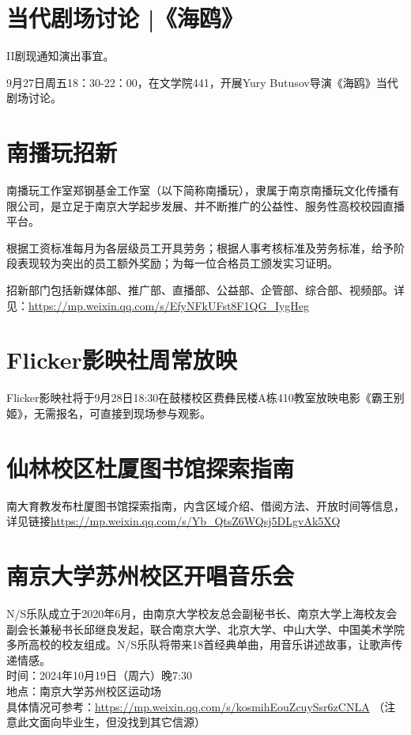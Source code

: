 \documentclass[letterpaper, 12pt]{article}
\begin{document}
\begin{multicols}{2}
\section{当代剧场讨论 |《海鸥》}
II剧现通知演出事宜。

9月27日周五18：30-22：00，在文学院441，开展Yury Butusov导演《海鸥》当代剧场讨论。
\section{南播玩招新}
南播玩工作室郑钢基金工作室（以下简称南播玩），隶属于南京南播玩文化传播有限公司，是立足于南京大学起步发展、并不断推广的公益性、服务性高校校园直播平台。

根据工资标准每月为各层级员工开具劳务；根据人事考核标准及劳务标准，给予阶段表现较为突出的员工额外奖励；为每一位合格员工颁发实习证明。

招新部门包括新媒体部、推广部、直播部、公益部、企管部、综合部、视频部。详见：\url{https://mp.weixin.qq.com/s/EfyNFkUFst8F1QG_IygHeg}
\section{Flicker影映社周常放映}
Flicker影映社将于9月28日18:30在鼓楼校区费彝民楼A栋410教室放映电影《霸王别姬》，无需报名，可直接到现场参与观影。
\section{仙林校区杜厦图书馆探索指南}
南大育教发布杜厦图书馆探索指南，内含区域介绍、借阅方法、开放时间等信息，详见链接\url{https://mp.weixin.qq.com/s/Yb_QtsZ6WQsj5DLgvAk5XQ}
\section{南京大学苏州校区开唱音乐会}
N/S乐队成立于2020年6月，由南京大学校友总会副秘书长、南京大学上海校友会副会长兼秘书长邱继良发起，联合南京大学、北京大学、中山大学、中国美术学院多所高校的校友组成。N/S乐队将带来18首经典单曲，用音乐讲述故事，让歌声传递情感。\\
时间：2024年10月19日（周六）晚7:30\\
地点：南京大学苏州校区运动场\\
具体情况可参考：\url{https://mp.weixin.qq.com/s/kosmihEouZcuySsr6zCNLA}
（注意此文面向毕业生，但没找到其它信源）

\end{multicols}
\end{document}

